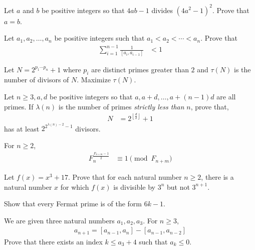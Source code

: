 \documentclass[problems.tex]{subfile}
\begin{document}
	
	\begin{problem}
		Let $a$ and $b$ be positive integers so that $4ab-1$ divides $(4a^2-1)^2$. Prove that $a=b$.
	\end{problem}
	
	\begin{problem}\label{prob:mirzakhani9}
		Let $a_1,a_2,\ldots,a_n$ be positive integers such that $a_1<a_2<\cdots < a_n$. Prove that
		\begin{align*}
			\sum_{i=1}^{n-1} \frac{1}{[a_i,a_{i-1}]} & <1
		\end{align*} 
	\end{problem}
	
	\begin{problem}
		Let $N=2^{p_1\cdots p_n}+1$ where $p_i$ are distinct primes greater than $2$ and $\tau(N)$ is the number of divisors of $N$. Maximize $\tau(N)$.
	\end{problem}
	
	\begin{problem}
		Let $n\geq3,a,d$ be positive integers so that $a,a+d,\ldots,a+(n-1)d$ are all primes. If $\lambda(n)$ is the number of primes \textit{strictly less than }$n$, prove that,
			\begin{align*}
				N & = 2^{\left\lfloor\frac{d}{2}\right\rfloor}+1
			\end{align*}
		has at least $2^{2^{\lambda(n)-2}-1}$ divisors.
	\end{problem}
	
	\begin{problem}
		For $n\geq2$,
		\begin{align*}
			F_n^{\frac{F_{n+m}-1}{2}} &\equiv1\pmod{F_{n+m}}
		\end{align*}
	\end{problem}
	
	\begin{problem}
		Let $f(x) = x^3 + 17$. Prove that for each natural number $n\geq 2$, there is a natural number $x$ for which $f(x)$ is divisible by $3^n$ but not $3^{n+1}$.
	\end{problem}
	
	\begin{problem}[Boylai]
		Show that every Fermat prime is of the form $6k-1$.
	\end{problem}
	
	\begin{problem}
		We are given three natural numbers $a_1,a_2,a_3$. For $n\geq3$,
			\begin{align*}
				a_{n+1} = [a_{n-1},a_n]-[a_{n-1},a_{n-2}]
			\end{align*}
		Prove that there exists an index $k\leq a_3+4$ such that $a_k\leq0$.
	\end{problem}
	
\end{document}
